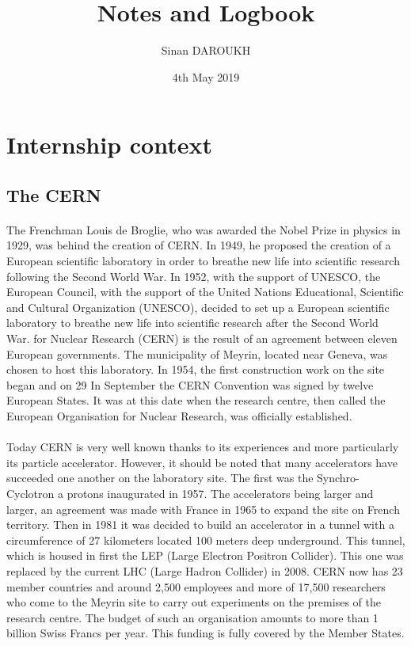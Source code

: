 \documentclass[a4paper, 10pt]{article}
\title{Notes and Logbook}
\author{Sinan DAROUKH}
\date{4th May 2019}
\begin{document}
\begin{titlepage}
\maketitle
\end{titlepage}

\tableofcontents
\newpage

\section{Internship context}
\subsection{The CERN}
\paragraph{}
The Frenchman Louis de Broglie, who was awarded the Nobel Prize in physics in 1929, was behind the creation of CERN. In 1949, he proposed the creation of a European scientific laboratory in order to breathe new life into scientific research following the Second World War. In 1952, with the support of UNESCO, the European Council, with the support of the United Nations Educational, Scientific and Cultural Organization (UNESCO), decided to set up a European scientific laboratory to breathe new life into scientific research after the Second World War.
for Nuclear Research (CERN) is the result of an agreement between eleven European governments. The municipality of Meyrin, located near Geneva, was chosen to host this laboratory.
In 1954, the first construction work on the site began and on 29
In September the CERN Convention was signed by twelve European States. It was at this date when the research centre, then called the European Organisation for Nuclear Research, was officially established.
\paragraph{}
Today CERN is very well known thanks to its experiences and more particularly its particle accelerator. However, it should be noted that many accelerators have succeeded one another on the laboratory site. The first was the Synchro-Cyclotron a protons inaugurated in 1957. The accelerators being larger and larger, an agreement was made with France in 1965 to expand the site on French territory. Then in 1981 it was decided to build an accelerator in a tunnel with a circumference of 27 kilometers located 100 meters deep underground. This tunnel, which is housed in first the LEP (Large Electron Positron Collider). This one was replaced by the current LHC (Large Hadron Collider) in 2008. CERN now has 23 member countries and around 2,500 employees and more of 17,500 researchers who come to the Meyrin site to carry out experiments on the premises of the research centre. The budget of such an organisation amounts to more than 1 billion Swiss Francs per year. This funding is fully covered by the Member States.
\end{document}
